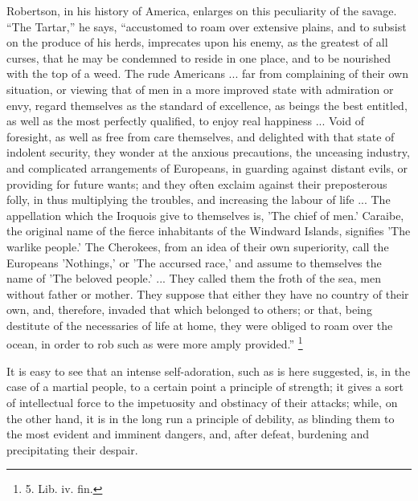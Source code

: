 Robertson, in his history of
America, enlarges on this peculiarity of the savage. ``The Tartar,'' he
says, ``accustomed to roam over extensive plains, and to subsist on the
produce of his herds, imprecates upon his enemy, as the greatest of
all curses, that he may be condemned to reside in one place, and to be
nourished with the top of a weed. The rude Americans ... far from
complaining of their own situation, or viewing that of men in a more
improved state with admiration or envy, regard themselves as the
standard of excellence, as beings the best entitled, as well as the
most perfectly qualified, to enjoy real happiness ... Void of
foresight, as well as free from care themselves, and delighted with
that state of indolent security, they wonder at the anxious
precautions, the unceasing industry, and complicated arrangements of Europeans, in guarding against distant evils, or
providing for future wants; and they often exclaim against their
preposterous folly, in thus multiplying the troubles, and increasing
the labour of life ... The appellation which the Iroquois give to
themselves is, 'The chief of men.' Caraibe, the original name of the
fierce inhabitants of the Windward Islands, signifies 'The warlike
people.' The Cherokees, from an idea of their own superiority, call
the Europeans 'Nothings,' or 'The accursed race,' and assume to
themselves the name of 'The beloved people.' ... They called them the
froth of the sea, men without father or mother. They suppose that
either they have no country of their own, and, therefore, invaded that
which belonged to others; or that, being destitute of the necessaries
of life at home, they were obliged to roam over the ocean, in order to
rob such as were more amply provided.'' \footnote{5.
Lib. iv. fin.}

It is easy to see that an
intense self-adoration, such as is here suggested, is, in the case of
a martial people, to a certain point a principle of strength; it gives
a sort of intellectual force to the impetuosity and obstinacy of their
attacks; while, on the other hand, it is in the long run a principle
of debility, as blinding them to the most evident and imminent
dangers, and, after defeat, burdening and precipitating their despair.

